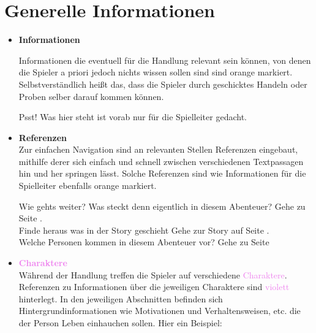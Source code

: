 
\thispagestyle{fancy-info}
\section*{Generelle Informationen}

\begin{itemize}
  \item \textcolor{OrangeBoxFrame}{\textbf{Informationen}}

  Informationen die eventuell für die Handlung relevant sein können, von denen die Spieler a priori jedoch nichts wissen sollen sind sind \textcolor{OrangeBoxFrame}{orange}
  markiert. Selbstverständlich heißt das, dass die Spieler durch geschicktes Handeln oder Proben selber darauf kommen können.

  \begin{info-box}

  Psst! Was hier steht ist vorab nur für die Spielleiter gedacht.

  \end{info-box}

  \item \textcolor{OrangeBoxFrame}{\textbf{Referenzen}} \\
  Zur einfachen Navigation sind an relevanten Stellen \textcolor{OrangeBoxFrame}{Referenzen} eingebaut, mithilfe derer sich einfach und
  schnell zwischen verschiedenen Textpassagen hin und her springen lässt. Solche Referenzen sind wie Informationen für die Spielleiter ebenfalls
  \textcolor{OrangeBoxFrame}{orange} markiert.

  \vspace{-5pt}
  \begin{ref-box}{Wie gehts weiter?}
      Was steckt denn eigentlich in diesem Abenteuer? \then Gehe zu Seite . \\
      Finde heraus was in der Story geschieht \then Gehe zur Story auf Seite . \\
      Welche Personen kommen in diesem Abenteuer vor? \then Gehe zu Seite 
  \end{ref-box}
  \vspace{-5pt}

  \item \textcolor{violet}{\textbf{Charaktere}} \\
  Während der Handlung treffen die Spieler auf verschiedene \textcolor{violet}{Charaktere}. Referenzen zu Informationen über
  die jeweiligen Charaktere sind \textcolor{violet}{violett} hinterlegt. In den jeweiligen Abschnitten befinden sich
  Hintergrundinformationen wie Motivationen und Verhaltensweisen, etc. die der Person Leben einhauchen sollen. Hier ein
  Beispiel:


\end{itemize}
